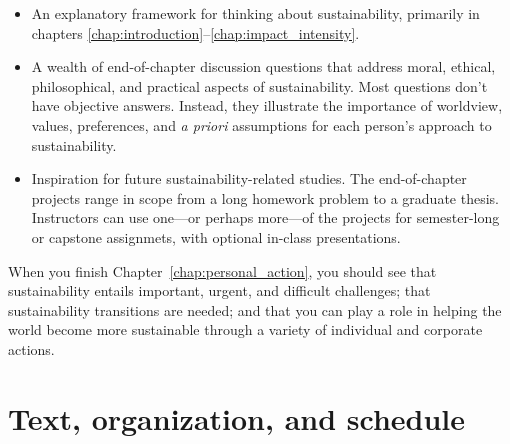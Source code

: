 {\begin{itemize}
    \item An explanatory framework for thinking about sustainability,
    primarily in chapters \ref{chap:introduction}--\ref{chap:impact_intensity}.
    
    \item A wealth of end-of-chapter discussion questions that 
    address moral, ethical, philosophical,
    and practical aspects of sustainability. 
    Most questions don't have objective answers. 
        Instead, they illustrate the importance
        of worldview, values, preferences, and \emph{a priori} assumptions 
        for each person's approach to sustainability. 
    
    \item Inspiration for future sustainability-related studies.
    The end-of-chapter projects range in scope from a long
    homework problem to a graduate thesis. 
    Instructors can use one---or perhaps more---of the projects for
    semester-long or capstone assignmets,
    with optional in-class presentations.
    
    \end{itemize}
    
    When you finish Chapter~\ref{chap:personal_action}, you should see
    that sustainability entails important, urgent, and difficult challenges; 
    that sustainability transitions are needed; and 
    that you can play a role in helping the world become more sustainable
    through a variety of individual and corporate actions.
    
    
      \section*{Text, organization, and schedule} 
    
}
